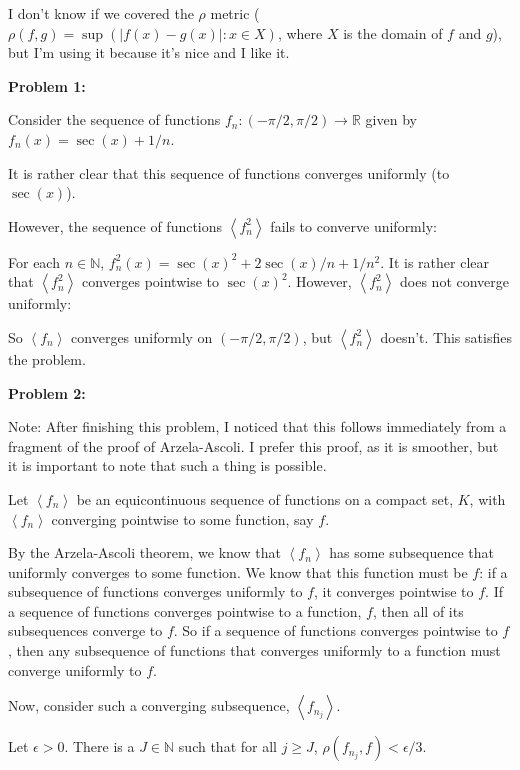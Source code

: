 \documentclass[a4paper,12pt]{article}
\newcommand{\tab}{\hspace{4mm}} %
\newcommand{\shunt}{\vspace{20mm}}
\newcommand{\absval}[1]{\lvert #1 \rvert}
\newcommand{\anbrack}[1]{\left\langle #1 \right\rangle}
\newcommand{\ep}{\epsilon}
\newcommand{\rh}{\rho}
\newcommand{\N}{\mathbb{N}}
\newcommand{\R}{\mathbb{R}}
\begin{document}
I don't know if we covered the $\rh$ metric ($\rh(f,g) = \sup(\absval{f(x)-g(x)}: x \in X)$, where $X$ is the domain of $f$ and $g$), but I'm using it because it's nice and I like it.

{\bf Problem 1:}

Consider the sequence of functions $f_n:(-\pi/2,\pi/2) \to \R $ given by $ f_n(x) =\sec(x) + 1/n$.

It is rather clear that this sequence of functions converges uniformly (to $\sec(x)$).

However, the sequence of functions $\anbrack{f_n^2}$ fails to converve uniformly:

\tab For each $n \in \N$, $f_n^2(x) = \sec(x)^2 + 2\sec(x)/n + 1/n^2$. It is rather clear that $\anbrack{f_n^2}$ converges pointwise to $\sec(x)^2$. However, $\anbrack{f_n^2}$ does not converge uniformly:

\tab \tab %

So $\anbrack{f_n}$ converges uniformly on $(-\pi/2, \pi/2)$, but $\anbrack{f_n^2}$ doesn't. This satisfies the problem.

\shunt

{\bf Problem 2:}

Note: After finishing this problem, I noticed that this follows immediately from a fragment of the proof of Arzela-Ascoli. I prefer this proof, as it is smoother, but it is important to note that such a thing is possible.

Let $\anbrack{f_n}$ be an equicontinuous sequence of functions on a compact set, $K$, with $\anbrack{f_n}$ converging pointwise to some function, say $f$.

By the Arzela-Ascoli theorem, we know that $\anbrack{f_n}$ has some subsequence that uniformly converges to some function. We know that this function must be $f$: if a subsequence of functions converges uniformly to $f$, it converges pointwise to $f$. If a sequence of functions converges pointwise to a function, $f$, then all of its subsequences converge to $f$. So if a sequence of functions converges pointwise to $f$, then any subsequence of functions that converges uniformly to a function must converge uniformly to $f$.

Now, consider such a converging subsequence, $\anbrack{f_{n_j}}$.

\tab Let $\ep >0$. There is a $J \in \N$ such that for all $j \geq J$, $\rh(f_{n_j}, f) < \ep/3$.
\end{document}
